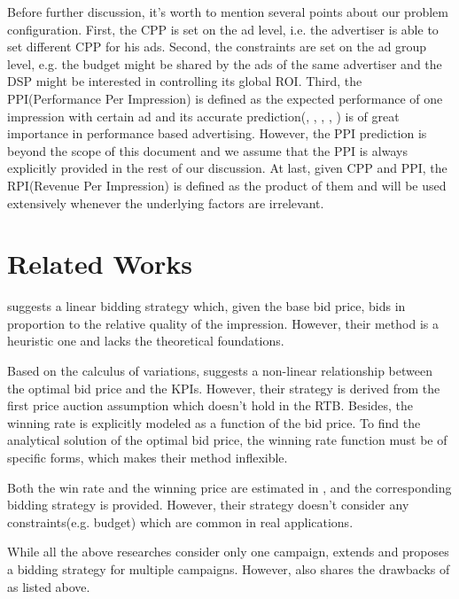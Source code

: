 \documentclass{article}
\begin{document}
Before further discussion, it's worth to mention several points about our problem configuration.
First, the CPP is set on the ad level, i.e. the advertiser is able to set different CPP for his ads.
Second, the constraints are set on the ad group level,
    e.g. the budget might be shared by the ads of the same advertiser
    and the DSP might be interested in controlling its global ROI.
Third, the PPI(Performance Per Impression) is defined as the expected performance of one impression with certain ad
    and its accurate prediction(\cite{Google2013}, \cite{Facebook2014}, \cite{FFM2016}, \cite{CVR}, \cite{DelayedFeedback})
    is of great importance in performance based advertising.
However, the PPI prediction is beyond the scope of this document
    and we assume that the PPI is always explicitly provided in the rest of our discussion.
At last, given CPP and PPI, the RPI(Revenue Per Impression) is defined as the product of them
    and will be used extensively whenever the underlying factors are irrelevant.

\section{Related Works}

\cite{M6D} suggests a linear bidding strategy which, given the base bid price,
    bids in proportion to the relative quality of the impression.
However, their method is a heuristic one and lacks the theoretical foundations.

Based on the calculus of variations, \cite{WeinanZhang2014} suggests a non-linear relationship between the optimal bid price and the KPIs.
However, their strategy is derived from the first price auction assumption which doesn't hold in the RTB.
Besides, the winning rate is explicitly modeled as a function of the bid price.
To find the analytical solution of the optimal bid price,
    the winning rate function must be of specific forms,
    which makes their method inflexible.

Both the win rate and the winning price are estimated in \cite{XiangLi2014}, and the corresponding bidding strategy is provided.
However, their strategy doesn't consider any constraints(e.g. budget) which are common in real applications.

While all the above researches consider only one campaign,
    \cite{WeinanZhang2015} extends \cite{WeinanZhang2014} and proposes a bidding strategy for multiple campaigns.
However, \cite{WeinanZhang2015} also shares the drawbacks of \cite{WeinanZhang2014} as listed above.
\end{document}
